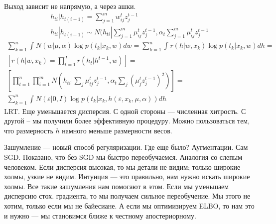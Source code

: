 \documentclass{minimal}
\begin{document}
Выход зависит не напрямую, а через ашки.
\begin{gather*}
h_{ti}|h_{t(i-1)}=\sum_{j=1}^{m} {w^t_{ij}z^{t-1}_{j}}\\
h_{ti}|h_{t(i-1)} \sim N(h_{ti}|\sum_{j=1}^{m} {\mu^t_{ij}z^{t-1}_{j}, \alpha_t \sum_{j=1}^{m} {\mu^t_{ij}z^{t-1}_{j}}}
\end{gather*}
\begin{gather*}
  \sum_{k=1}^{n} {\int_{}^{} {N(w|\mu,\alpha)\log p(t_k|x_k,w)dw}}=
  \sum_{k=1}^{n} {\int_{}^{} {r(h|w,x_k)\log p(t_k|x_k,w)dh}}=\\
  \left[r(h|w,x_k)=\prod_{t=1}^{T} {r(h_t|h^{t-1},w)}\right]=\\
  \left[\prod_{t=1}^{n} {\prod_{i=1}^{m} {N\left(h_{ti}\bigg|\sum_{j}^{} {\mu^t_{ij}z_j^{t-1},\alpha_t \sum_{j}^{} {\left(\mu^t_j z^{t-1}_j\right)^2}}\right)}}\right]=\\
  \sum_{k=1}^{n} {\int_{}^{} {N(\varepsilon| 0, I)\log p\left(t_k|x_k,h(\varepsilon, x_k, \mu, \alpha)\right)dh}}
\end{gather*}
LRT. Еще уменьшается дисперсия. С одной стороны --- численная хитрость. С другой -- мы получили более эффективную процедуру. Можно пользоваться тем, что размерность $h$ намного меньше размерности весов.

Зашумление --- новый способ регуляризации. Где еще было? Аугментации. Сам SGD. Показано, что без SGD мы быстро переобучаемся. Аналогия со слепым человеком. Если дисперсия высокая, то мы детали не видим; только широкие холмы, узкие не видим. Интуиция --- это правильно, нам нужно искать широкие холмы. Все такие зашумления нам помогают в этом. Если мы уменьшаем дисперсию стох. градиента, то мы получаем сильное переобучение. Мы этого не хотим, только если мы не байесиане. А если мы
оптимизируем ELBO, то нам это и нужно --- мы становимся ближе к честному апостериорному.
\end{document}
